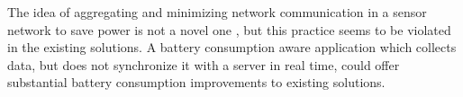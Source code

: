 The idea of aggregating and minimizing network communication in a sensor network to save power is not a novel one \parencite{korteweg2007data} \parencite{mhatre2004design}, but this practice seems to be violated in the existing solutions. A battery consumption aware application which collects data, but does not synchronize it with a server in real time, could offer substantial battery consumption improvements to existing solutions.
